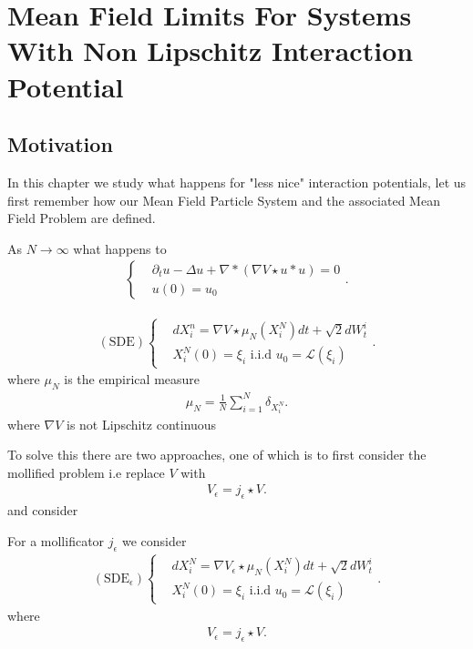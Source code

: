 \chapter{Mean Field Limits For Systems With Non Lipschitz Interaction Potential}
\section{Motivation}
In this chapter we study what happens for "less nice" interaction potentials, let us first 
remember how our Mean Field Particle System and the associated Mean Field Problem are defined.
\begin{Definition}
 As $N\to \infty$  what happens to 
 \begin{align*}
\begin{cases}
  &\partial_t u - \Delta u + \nabla * (\nabla V \star  u * u) = 0\\
  &u(0) = u_{0}
\end{cases}
 .\end{align*}
\end{Definition}
\begin{Definition}
\begin{align*}
  (\text{SDE})\begin{cases}
    &dX_i^n = \nabla V \star  \mu_N(X_i^{N} ) dt + \sqrt{2}dW_t^i\\
    &X_i^N(0) = \xi_i \text{ i.i.d } u_{0}=\mathcal{L}(\xi_i)
  \end{cases}
.\end{align*}  
where $\mu_N$ is the empirical measure
\begin{align*}
  \mu_N = \frac{1}{N} \sum_{i=1}^{N} \delta_{X_i^N}
.\end{align*}
where $\nabla V$ is not Lipschitz continuous
\end{Definition}
To solve this there are two approaches, one of which is to first consider the mollified problem i.e 
replace $V$ with
\begin{align*}
  V_\epsilon = j_{\epsilon}\star V
.\end{align*}
and consider 
\begin{Definition}
  For a mollificator $j_\epsilon$ we consider 
  \begin{align*}
  (\text{SDE}_\epsilon)\begin{cases}
    &dX_i^N = \nabla V_\epsilon \star  \mu_N(X_i^{N} ) dt + \sqrt{2}dW_t^i\\
    &X_i^N(0) = \xi_i \text{ i.i.d } u_{0}=\mathcal{L}(\xi_i)
  \end{cases}
.\end{align*}  
where 
\begin{align*}
  V_\epsilon = j_{\epsilon}\star V
.\end{align*}
\end{Definition}
